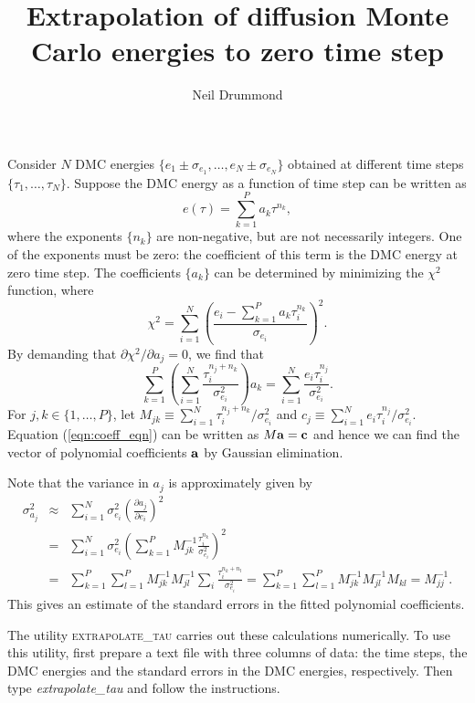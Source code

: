 \documentclass[10pt,a4]{article}
\begin{document}
\title{Extrapolation of diffusion Monte Carlo energies to zero time step}

\author{Neil Drummond}

\maketitle

Consider $N$ DMC energies $\{ e_1 \pm \sigma_{e_1} , \ldots, e_N \pm
\sigma_{e_N} \}$ obtained at different time steps $\{ \tau_1, \ldots, \tau_N
\}$.  Suppose the DMC energy as a function of time step can be written as
\begin{equation} e(\tau) = \sum_{k=1}^P a_k \tau^{n_k}, \end{equation}
where the exponents $\{ n_k \}$ are non-negative, but are not necessarily
integers. One of the exponents must be zero: the coefficient of this term is
the DMC energy at zero time step.  The coefficients $\{ a_k \}$ can be
determined by minimizing the $\chi^2$ function, where
\begin{equation} \chi^2 = \sum_{i=1}^N \left( \frac{e_i-\sum_{k=1}^P
    a_k \tau_i^{n_k}}{\sigma_{e_i}} \right)^2. \end{equation} By demanding
that $\partial \chi^2 / \partial a_j=0$, we find that
\begin{equation} \sum_{k=1}^P \left( \sum_{i=1}^N
  \frac{\tau_i^{n_j+n_k}}{\sigma_{e_i}^2} \right) a_k = \sum_{i=1}^N \frac{e_i
  \tau_i^{n_j}}{\sigma_{e_i}^2}. \label{eqn:coeff_eqn}
  \end{equation}
For $j,k \in \{ 1,\ldots,P \}$, let $M_{jk} \equiv \sum_{i=1}^N
\tau_i^{n_j+n_k} / \sigma_{e_i}^2$ and $c_j \equiv \sum_{i=1}^N e_i
\tau_i^{n_j} / \sigma_{e_i}^2$.  Equation (\ref{eqn:coeff_eqn}) can be written
as $M {\bf a} = {\bf c}$ and hence we can find the vector of polynomial
coefficients ${\bf a}$ by Gaussian elimination.

Note that the variance in $a_j$ is approximately given by
\begin{eqnarray} \sigma_{a_j}^2 & \approx & \sum_{i=1}^N \sigma_{e_i}^2
  \left( \frac{\partial a_j}{\partial e_i} \right)^2 \nonumber \\ & = &
  \sum_{i=1}^N \sigma_{e_i}^2 \left( \sum_{k=1}^P M^{-1}_{jk}
  \frac{\tau_i^{n_k}}{\sigma_{e_i}^2} \right)^2 \nonumber \\ & = &
  \sum_{k=1}^P \sum_{l=1}^P M^{-1}_{jk} M^{-1}_{jl} \sum_i
  \frac{\tau_i^{n_k+n_l}}{\sigma_{e_i}^2} = \sum_{k=1}^P \sum_{l=1}^P
  M^{-1}_{jk} M^{-1}_{jl} M_{kl} = M^{-1}_{jj}. \end{eqnarray} This gives an
  estimate of the standard errors in the fitted polynomial coefficients.

The utility \textsc{extrapolate\_tau} carries out these calculations
numerically.  To use this utility, first prepare a text file with three
columns of data: the time steps, the DMC energies and the standard errors in
the DMC energies, respectively.  Then type \textit{extrapolate\_tau} and
follow the instructions.
\end{document}
